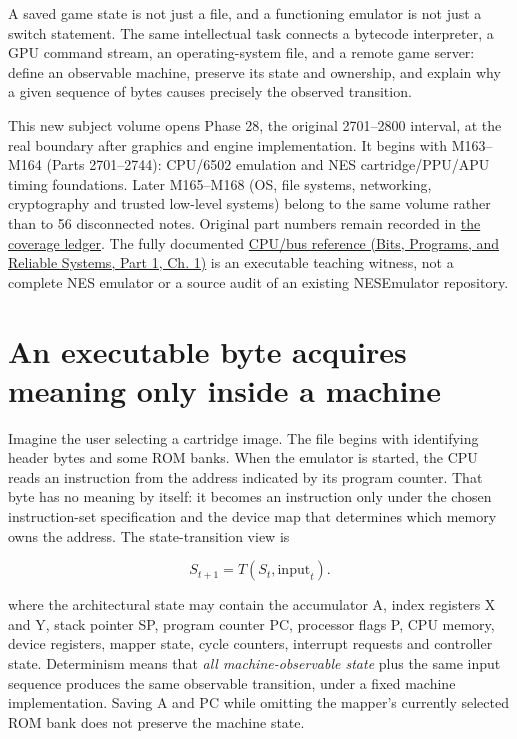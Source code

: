 A saved game state is not just a file, and a functioning emulator is not just a switch statement. The same intellectual task connects a bytecode interpreter, a GPU command stream, an operating-system file, and a remote game server: define an observable machine, preserve its state and ownership, and explain why a given sequence of bytes causes precisely the observed transition.

This new subject volume opens Phase 28, the original 2701--2800 interval, at the real boundary after graphics and engine implementation. It begins with M163--M164 (Parts 2701--2744): CPU/6502 emulation and NES cartridge/PPU/APU timing foundations. Later M165--M168 (OS, file systems, networking, cryptography and trusted low-level systems) belong to the same volume rather than to 56 disconnected notes. Original part numbers remain recorded in \hyperref[appendix-fd090d982a15-phase-28-m163m168-parts-27012800-deterministic-and-trusted-low-level-systems]{the coverage ledger}. The fully documented \href{../01-Bits-Programs-and-Reliable-Systems-P01/main.pdf\#source-file-552a9e2296dc984412c8f06d}{CPU/bus reference (Bits, Programs, and Reliable Systems, Part 1, Ch. 1)} is an executable teaching witness, not a complete NES emulator or a source audit of an existing NESEmulator repository.

\section{An executable byte acquires meaning only inside a machine}\label{01-foundations-i-ch016-an-executable-byte-acquires-meaning-only-inside-a-machine}

\hypertarget{01-foundations-i-ch016-an-executable-byte-acquires-meaning-only-inside-a-machine}{}

Imagine the user selecting a cartridge image. The file begins with identifying header bytes and some ROM banks. When the emulator is started, the CPU reads an instruction from the address indicated by its program counter. That byte has no meaning by itself: it becomes an instruction only under the chosen instruction-set specification and the device map that determines which memory owns the address. The state-transition view is

\[
S_{t+1}=T(S_t,\mathrm{input}_t).
\]

where the architectural state may contain the accumulator A, index registers X and Y, stack pointer SP, program counter PC, processor flags P, CPU memory, device registers, mapper state, cycle counters, interrupt requests and controller state. Determinism means that \emph{all machine-observable state} plus the same input sequence produces the same observable transition, under a fixed machine implementation. Saving A and PC while omitting the mapper's currently selected ROM bank does not preserve the machine state.

